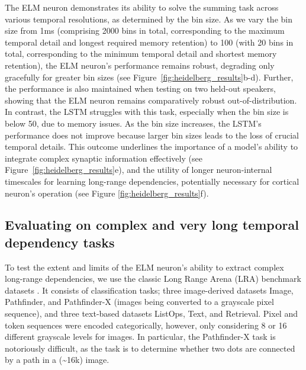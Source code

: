 \documentclass{article} \usepackage{iclr2024_doc_style,times}
\begin{document}
The ELM neuron demonstrates its ability to solve the summing task across various temporal resolutions, as determined by the bin size. As we vary the bin size from 1ms (comprising 2000 bins in total, corresponding to the maximum temporal detail and longest required memory retention) to 100 (with 20 bins in total, corresponding to the minimum temporal detail and shortest memory retention), the ELM neuron's performance remains robust, degrading only gracefully for greater bin sizes (see Figure~\ref{fig:heidelberg_results}b-d). Further, the performance is also maintained when testing on two held-out speakers, showing that the ELM neuron remains comparatively robust out-of-distribution. 
In contrast, the LSTM struggles with this task, especially when the bin size is below 50, due to memory issues. As the bin size increases, the LSTM's performance does not improve because larger bin sizes leads to the loss of crucial temporal details. This outcome underlines the importance of a model's ability to integrate complex synaptic information effectively (see Figure~\ref{fig:heidelberg_results}e), and the utility of longer neuron-internal timescales for learning long-range dependencies, potentially necessary for cortical neuron's operation (see Figure \ref{fig:heidelberg_results}f).

\subsection{Evaluating on complex and very long temporal dependency tasks}
\label{lsm_benchmark_experiments}

To test the extent and limits of the ELM neuron's ability to extract complex long-range dependencies, we use the classic Long Range Arena (LRA) benchmark datasets \cite{tay2021long}. It consists of classification tasks; three image-derived datasets Image, Pathfinder, and Pathfinder-X (images being converted to a  grayscale pixel sequence), and three text-based datasets ListOps, Text, and Retrieval. Pixel and token sequences were encoded categorically, however, only considering 8 or 16 different grayscale levels for images. In particular, the Pathfinder-X task is notoriously difficult, as the task is to determine whether two dots are connected by a path in a  (\textasciitilde 16k) image.
\end{document}

